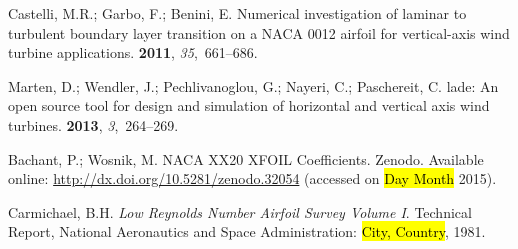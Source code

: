\documentclass[energies,article,accept,moreauthors,pdftex,10pt,a4paper]{mdpi}
\theoremstyle{mdpi}
\newcounter{re}
\begin{document}
\begin{thebibliography}{999}
Castelli, M.R.; Garbo, F.; Benini, E.
\newblock Numerical investigation of laminar to turbulent boundary layer
 transition on a NACA 0012 airfoil for vertical-axis wind turbine
 applications.
 {\bf 2011}, {\em 35},~661--686.

Marten, D.; Wendler, J.; Pechlivanoglou, G.; Nayeri, C.; Paschereit, C.
lade: An open source tool for design and simulation of horizontal
 and vertical axis wind turbines.
 {\bf 2013}, {\em 3},~264--269.

Bachant, P.; Wosnik, M.
\newblock NACA XX20 XFOIL Coefficients.
\newblock Zenodo. Available online: \url{http://dx.doi.org/10.5281/zenodo.32054} (accessed on \hl{Day Month} 2015).

Carmichael, B.H.
\newblock \emph{Low {R}eynolds Number Airfoil Survey Volume {I}}.
\newblock Technical Report, National Aeronautics and Space Administration: \hl{City, Country},
 1981.

\end{thebibliography}
\end{document}
